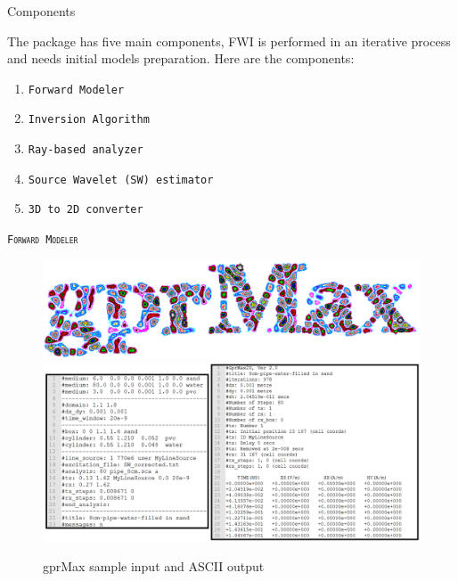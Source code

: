\documentclass[final]{beamer}
\newlength{\onecolwid}
\begin{document}
\begin{frame}[t]
\begin{columns}[t]
\begin{column}{\onecolwid}
\begin{alertblock}{Components}
	
The package has five main components, FWI is performed in an  iterative process and needs initial models preparation. Here are the components:
	\begin{enumerate}
		\item \hspace{1cm} \texttt{Forward Modeler}
		\item \hspace{1cm} \texttt{Inversion Algorithm}
		\item \hspace{1cm} \texttt{Ray-based analyzer}
		\item \hspace{1cm} \texttt{Source Wavelet (SW) estimator}
		\item \hspace{1cm} \texttt{3D to 2D converter} 
	\end{enumerate}
	
\end{alertblock}

\vspace*{2cm}

\begin{block}{\textsc{\texttt{Forward Modeler}}}
	
\begin{figure}
	\includegraphics[width=0.7\linewidth]{gprmax.png}
	\vspace{1cm}
	\includegraphics[width=1\linewidth]{gprmax_image.png}
	\caption{gprMax sample input and ASCII output \cite{gprmax}}
\end{figure}
	

\end{block}
\end{column}
\end{columns}
\end{frame}
\end{document}
